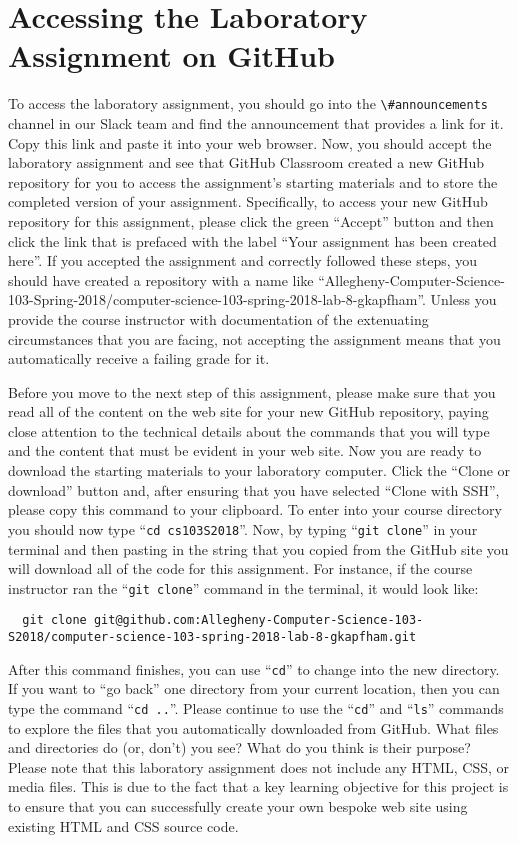 \documentclass[11pt]{article}
\newcommand{\command}[1]{``\lstinline{#1}''}
\newcommand{\channel}[1]{\lstinline{#1}}
\newcommand{\step}[1]{``{#1}''}
\begin{document}
\section*{Accessing the Laboratory Assignment on GitHub}

To access the laboratory assignment, you should go into the
\channel{\#announcements} channel in our Slack team and find the announcement
that provides a link for it. Copy this link and paste it into your web browser.
Now, you should accept the laboratory assignment and see that GitHub Classroom
created a new GitHub repository for you to access the assignment's starting
materials and to store the completed version of your assignment. Specifically,
to access your new GitHub repository for this assignment, please click the green
``Accept'' button and then click the link that is prefaced with the label ``Your
assignment has been created here''. If you accepted the assignment and correctly
followed these steps, you should have created a repository with a name like
``Allegheny-Computer-Science-103-Spring-2018/computer-science-103-spring-2018-lab-8-gkapfham''.
Unless you provide the course instructor with documentation of the extenuating
circumstances that you are facing, not accepting the assignment means that you
automatically receive a failing grade for it.

Before you move to the next step of this assignment, please make sure that you
read all of the content on the web site for your new GitHub repository, paying
close attention to the technical details about the commands that you will type
and the content that must be evident in your web site. Now you are ready to
download the starting materials to your laboratory computer. Click the ``Clone
or download'' button and, after ensuring that you have selected ``Clone with
SSH'', please copy this command to your clipboard. To enter into your course
directory you should now type \command{cd cs103S2018}. Now, by typing
\command{git clone} in your terminal and then pasting in the string that you
copied from the GitHub site you will download all of the code for this
assignment. For instance, if the course instructor ran the \command{git clone}
command in the terminal, it would look like:

\begin{lstlisting}
  git clone git@github.com:Allegheny-Computer-Science-103-S2018/computer-science-103-spring-2018-lab-8-gkapfham.git
\end{lstlisting}

After this command finishes, you can use \command{cd} to change into the new
directory. If you want to \step{go back} one directory from your current
location, then you can type the command \command{cd ..}. Please continue to use
the \command{cd} and \command{ls} commands to explore the files that you
automatically downloaded from GitHub. What files and directories do (or, don't)
you see? What do you think is their purpose? Please note that this laboratory
assignment does not include any HTML, CSS, or media files. This is due to the
fact that a key learning objective for this project is to ensure that you can
successfully create your own bespoke web site using existing HTML and CSS source
code.
\end{document}
